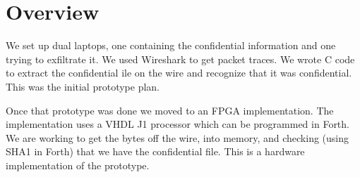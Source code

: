 \section{Overview}

We set up dual laptops, one containing the confidential information
and one trying to exfiltrate it. We used Wireshark to get packet
traces. We wrote C code to extract the confidential ile on the wire
and recognize that it was confidential. This was the initial prototype
plan.

Once that prototype was done we moved to an FPGA implementation. The
implementation uses a VHDL J1 processor which can be programmed in
Forth. We are working to get the bytes off the wire, into memory, 
and checking (using SHA1 in Forth) that we have the confidential file.
This is a hardware implementation of the prototype.


